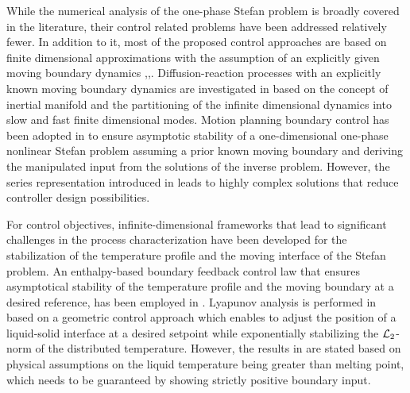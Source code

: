 \documentclass[journal]{IEEEtran}
\begin{document}
 
 While the numerical analysis of  the one-phase Stefan problem is broadly covered in the literature, their control related problems have been addressed relatively fewer. In addition to it, most of the proposed control approaches are based on finite dimensional approximations with the assumption of  an explicitly given moving boundary dynamics \cite{Daraoui2010},\cite{Armaou01},\cite{Petit10}. Diffusion-reaction processes with an explicitly known moving boundary dynamics are investigated in  \cite{Armaou01} based on the concept of inertial manifold \cite{Christofides98_Parabolic} and the  partitioning of the infinite dimensional dynamics into slow and fast  finite dimensional modes.     Motion planning boundary control has been adopted in   \cite{Petit10} to ensure asymptotic stability of a one-dimensional one-phase nonlinear Stefan problem   assuming  a prior known  moving boundary  and deriving the manipulated input  from the solutions of   the inverse problem. However, the series representation introduced in   \cite{Petit10}  leads to highly complex solutions that reduce controller design possibilities. 

For control objectives, infinite-dimensional frameworks that lead to significant challenges in the process characterization have been developed for the stabilization of  the temperature profile and the moving interface of the Stefan problem. An  enthalpy-based boundary feedback control law that ensures asymptotical stability of the temperature profile and the moving boundary at a desired reference, has been employed in \cite{petrus12}.  Lyapunov analysis is performed in  \cite{maidi2014} based on a  geometric control approach which enables  to adjust the position of a liquid-solid interface at a desired setpoint while  exponentially stabilizing  the ${\cal L}_2$-norm of the distributed temperature. However, the  results in \cite{maidi2014}  are stated based on physical assumptions on the liquid temperature being greater than melting point, which needs to be guaranteed by showing strictly positive boundary input.
\end{document}
